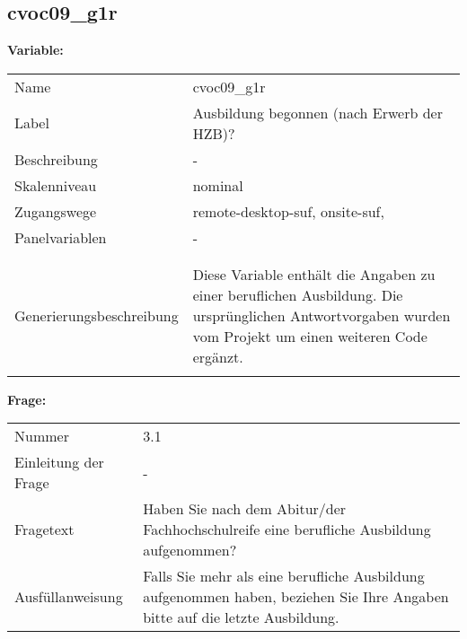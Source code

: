 	
	
	\subsection{cvoc09\_g1r}
	\label{subSection:cvoc09_g1r}

	\noindent\textbf{Variable:}\\
		\begin{tabular}{lL{11.3cm}}
			\label{tableVariable:cvoc09_g1r}
			Name & cvoc09\_g1r \\
			Label & Ausbildung begonnen (nach Erwerb der HZB)? \\
			Beschreibung & - \\
			Skalenniveau & nominal \\
			Zugangswege &
				remote-desktop-suf,
				onsite-suf,
 \\
			Panelvariablen & -
			 \\
			 \\
 \\
					Generierungsbeschreibung & Diese Variable enthält die Angaben zu einer beruflichen Ausbildung. Die ursprünglichen Antwortvorgaben wurden vom Projekt um einen weiteren Code ergänzt. 
				 \\	
			 \\
		\end{tabular}

		\vspace*{1 cm}
		\noindent\textbf{Frage:}\\
		\begin{tabular}{lL{11.3cm}}
			\label{tableQuestion:cvoc09_g1r}
			Nummer & 3.1 \\
			Einleitung der Frage & - \\
			Fragetext & Haben Sie nach dem Abitur/der Fachhochschulreife eine berufliche Ausbildung aufgenommen? \\
			Ausfüllanweisung & Falls Sie mehr als eine berufliche Ausbildung aufgenommen haben, beziehen Sie Ihre Angaben bitte auf die letzte Ausbildung. \\
		\end{tabular}





